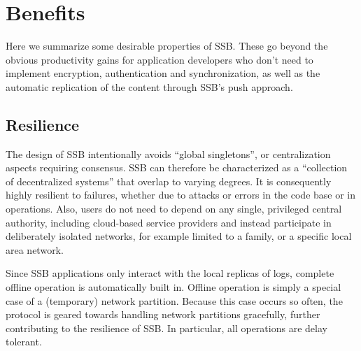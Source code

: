 \documentclass[10pt,sigconf,rewiew]{acmart}
\begin{document}
%
%
%
%

\section{Benefits}
\label{sect:yay}

Here we summarize some desirable properties of SSB. These go beyond the obvious productivity gains for application developers who don't need to implement encryption, authentication and synchronization, as well as the automatic replication of the content through SSB's push approach.

\subsection{Resilience}

The design of SSB intentionally avoids ``global singletons'', or centralization aspects requiring consensus. SSB can therefore be characterized as a ``collection of decentralized systems'' that overlap to varying degrees. It is consequently highly resilient to failures, whether due to attacks or errors in the code base or in operations. Also, users do not need to depend on any single, privileged central authority, including cloud-based service providers and instead participate in deliberately isolated networks, for example limited to a family, or a specific local area network.

Since SSB applications only interact with the local replicas of logs, complete offline operation is automatically built in. Offline operation is simply a special case of a (temporary) network partition. Because this case occurs so often, the protocol is geared towards handling network partitions gracefully, further contributing to the resilience of SSB. In particular, all operations are delay tolerant.
\end{document}
